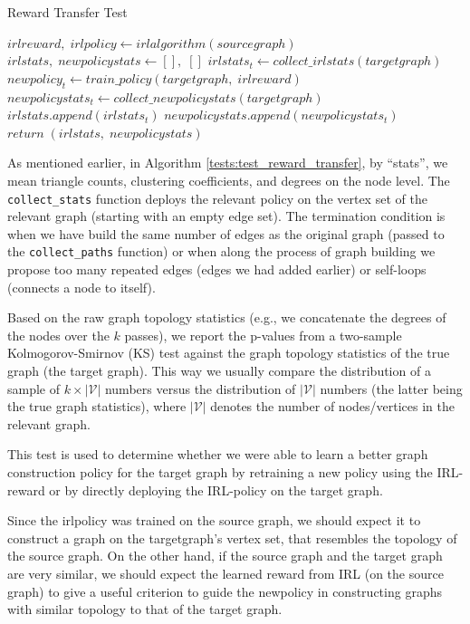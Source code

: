 \documentclass{report}
\numberwithin{equation}{section}
\numberwithin{figure}{section}
\numberwithin{table}{section}
\numberwithin{algorithm}{section}
\begin{document}
\begin{algorithm}
  \caption{Reward Transfer Test}
  \label{tests:test_reward_transfer}
  \begin{algorithmic}
    \State $irlreward,\; irlpolicy \gets irlalgorithm(sourcegraph)$
    \State $irlstats,\; newpolicystats \gets [],\; []$
    \State $irlstats_t \gets collect\_irlstats(targetgraph)$
    \State $newpolicy_t \gets train\_policy(targetgraph,\; irlreward)$
    \State $newpolicystats_t \gets collect\_newpolicystats(targetgraph)$
    \State $irlstats.append(irlstats_t)$
    \State $newpolicystats.append(newpolicystats_t)$
    \EndFor
    \State $return\; (irlstats,\; newpolicystats)$
  \end{algorithmic}
\end{algorithm}

As mentioned earlier, in 
Algorithm \ref{tests:test_reward_transfer}, 
by ``stats'', we mean triangle counts, clustering coefficients, 
and degrees on the node level. 
The \verb|collect_stats| function deploys the relevant 
policy on the vertex set of the relevant graph (starting with an 
empty edge set). The termination condition is when we 
have build the same 
number of edges as the original graph (passed to the \verb|collect_paths|
function) or when along the process of graph building we propose 
too many repeated edges (edges we had added earlier) or 
self-loops (connects a node to itself).

Based on the raw graph topology statistics (e.g., we concatenate the 
degrees of the nodes over the $k$ passes), we report the 
p-values from a two-sample Kolmogorov-Smirnov (KS) 
\citep{KStest3} 
test against the 
graph topology statistics of the true graph
(the target graph). 
This way we usually compare the distribution of a 
sample of $k\times |\mathcal{V}|$ 
numbers versus the distribution of $|\mathcal{V}|$ numbers (the latter being the 
true graph statistics), where $|\mathcal{V}|$ denotes the number 
of nodes/vertices in the relevant graph.

This test is used to determine whether we were able to learn a better 
graph construction policy for the target graph 
by retraining a new policy using the IRL-reward 
or by directly deploying the IRL-policy on the target graph.

Since the irlpolicy was trained on the source graph, we should expect 
it to construct a graph on the targetgraph's vertex set, that resembles 
the topology of the source graph. On the other hand, if the source 
graph and the target graph are very similar, we should expect 
the learned reward from IRL (on the source graph) to give a useful 
criterion to guide the 
newpolicy in constructing graphs with similar topology to that 
of the target graph.
\end{document}
